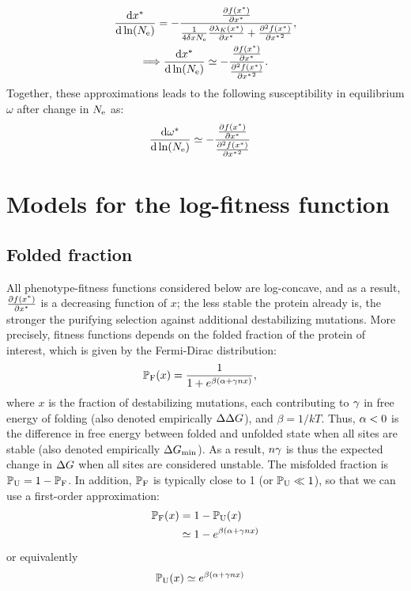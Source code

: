 \documentclass{article}
\begin{document}
\begin{gather}
    \frac{ \mathrm{d} x^{*}}{\mathrm{d} \ln (N_{\text{e}})}  = - \frac{\frac{ \partial f (x^{*}) }{\partial {x^{*}}}}{\frac{1}{4 \delta x N_{\text{e}}} \frac{\partial \lambda_K (x^{*}) }{\partial x^{*} } + \frac{ \partial^2 f (x^{*}) }{\partial {x^{*}}^2}},\\
    \Longrightarrow \frac{ \mathrm{d} x^{*}}{\mathrm{d} \ln (N_{\text{e}})}  \simeq - \frac{\frac{ \partial f (x^{*}) }{\partial {x^{*}}}}{\frac{ \partial^2 f (x^{*}) }{\partial {x^{*}}^2}}. \label{eq:approx_dx_dlnNe}
\end{gather}
Together, these approximations leads to the following susceptibility in equilibrium $\omega$ after change in $N_{\text{e}}$ as:
\begin{align}
    \frac{ \mathrm{d} \omega^{*}}{\mathrm{d} \ln (N_{\text{e}})} & \simeq - \frac{\frac{ \partial f (x^{*}) }{\partial {x^{*}}}}{\frac{ \partial^2 f (x^{*}) }{\partial {x^{*}}^2}}
    \label{eq:approx_dw_dlnNe}
\end{align}


\section{Models for the log-fitness function}
\label{sec:models-for-the-log-fitness-function}

\subsection{Folded fraction}
\label{subsec:folded-fraction}

All phenotype-fitness functions considered below are log-concave, and as a result, $\frac{ \partial f (x^{*}) }{\partial {x^{*}}}$ is a decreasing function of $x$; the less stable the protein already is, the stronger the purifying selection against additional destabilizing mutations. More precisely, fitness functions depends on the folded fraction of the protein of interest, which is given by the Fermi-Dirac distribution:
\begin{align}
    \mathbb{P}_{\text{F}} (x) & = \frac{1}{1 + e^{\beta(\alpha + \gamma n x)}},
\end{align}
where $x$ is the fraction of destabilizing mutations, each contributing to $\gamma$ in free energy of folding (also denoted empirically $\Delta \Delta G$), and $\beta = 1 / kT$.
Thus, $\alpha < 0$ is the difference in free energy between folded and unfolded state when all sites are stable (also denoted empirically $\Delta G_{\text{min}}$).
As a result, $n \gamma$ is thus the expected change in $\Delta G$ when all sites are considered unstable.
The misfolded fraction is  $\mathbb{P}_{\text{U}} = 1-\mathbb{P}_{\text{F}}$.
In addition, $\mathbb{P}_{\text{F}}$ is typically close to 1 (or $\mathbb{P}_{\text{U}} \ll 1$), so that we can use a first-order approximation:
\begin{align}
    \mathbb{P}_{\text{F}}(x) & = 1 - \mathbb{P}_{\text{U}}(x) \\
    & \simeq 1 - e^{\beta(\alpha + \gamma n x)}
\end{align}
or equivalently
\begin{align}
    \mathbb{P}_{\text{U}}(x) & \simeq e^{\beta(\alpha + \gamma n x)}
\end{align}
\end{document}
